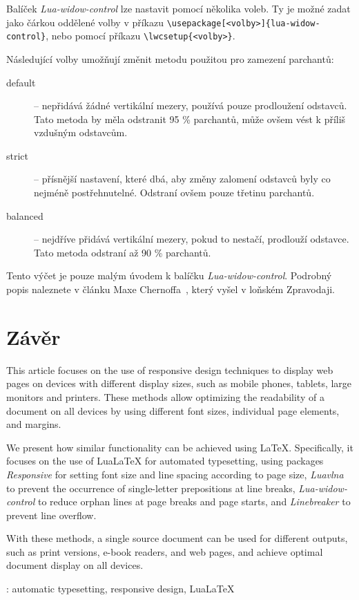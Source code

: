 \documentclass{csbulletin}
\newcommand\balicek[1]{\textit{#1}}
\begin{document}
Balíček \balicek{Lua-widow-control} lze nastavit pomocí několika voleb. Ty je možné zadat jako čárkou oddělené volby 
v příkazu  \verb|\usepackage[<volby>]{lua-widow-control}|, nebo pomocí příkazu 
\verb|\lwcsetup{<volby>}|.

Následující volby umožňují změnit metodu použitou pro zamezení parchantů:

 \begin{description}
   \item[default] – nepřidává žádné vertikální mezery, používá pouze prodloužení odstavců. Tato metoda by měla odstranit 95 \% parchantů, může ovšem vést k příliš vzdušným odstavcům.
   \item[strict] – přísnější nastavení, které dbá, aby změny zalomení odstavců byly co nejméně postřehnutelné.  Odstraní ovšem pouze třetinu parchantů.
   \item[balanced] – nejdříve přidává vertikální mezery, pokud to nestačí, prodlouží odstavce. Tato metoda odstraní až 90 \% parchantů.
  \end{description}

Tento výčet je pouze malým úvodem k balíčku \balicek{Lua-widow-control}. Podrobný popis naleznete v článku Maxe Chernoffa~\cite{chernoff}, který vyšel v loňském Zpravodaji.

\section{Závěr}



\printbibliography

\begin{summary}
  This article focuses on the use of responsive design techniques to display
  web pages on devices with different display sizes, such as mobile phones,
  tablets, large monitors and printers. These methods allow optimizing the
  readability of a document on all devices by using different font sizes,
  individual page elements, and margins.

  We present how similar functionality can be achieved using \LaTeX.
  Specifically, it focuses on the use of Lua\LaTeX{} for automated typesetting,
  using packages \balicek{Responsive} for setting font size and line spacing according to page size,
  \balicek{Luavlna} to prevent the occurrence of
  single-letter prepositions at line breaks, \balicek{Lua-widow-control} to
  reduce orphan lines at page breaks and page starts, and \balicek{Linebreaker}
  to prevent line overflow.

  With these methods, a single source document can be used for different
  outputs, such as print versions, e-book readers, and web pages, and achieve
  optimal document display on all devices.

\keywords: automatic typesetting, responsive design, Lua\LaTeX
\end{summary}
\end{document}
